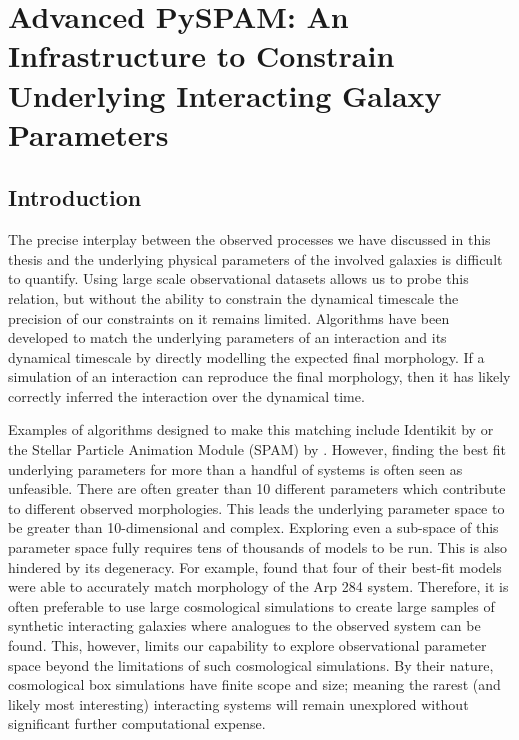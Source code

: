 \chapter{Advanced PySPAM: An Infrastructure to Constrain Underlying Interacting Galaxy Parameters}\label{chapter4}
\section{Introduction}\label{Introduction}
\noindent The precise interplay between the observed processes we have discussed in this thesis and the underlying physical parameters of the involved galaxies is difficult to quantify. Using large scale observational datasets allows us to probe this relation, but without the ability to constrain the dynamical timescale the precision of our constraints on it remains limited. Algorithms have been developed to match the underlying parameters of an interaction and its dynamical timescale by directly modelling the expected final morphology. If a simulation of an interaction can reproduce the final morphology, then it has likely correctly inferred the interaction over the dynamical time.

Examples of algorithms designed to make this matching include Identikit by \citet{2009AJ....137.3071B} or the Stellar Particle Animation Module (SPAM) by \citet{1990AJ....100.1477W}. However, finding the best fit underlying parameters for more than a handful of systems is often seen as unfeasible. There are often greater than 10 different parameters which contribute to different observed morphologies. This leads the underlying parameter space to be greater than 10-dimensional and complex. Exploring even a sub-space of this parameter space fully requires tens of thousands of models to be run. This is also hindered by its degeneracy. For example, \citet{2010ASPC..423..227S} found that four of their best-fit models were able to accurately match morphology of the Arp 284 system. Therefore, it is often preferable to use large cosmological simulations \citep[e.g.][]{2015MNRAS.446..521S, 2018MNRAS.480..800H, 2020MNRAS.493.3716H} to create large samples of synthetic interacting galaxies where analogues to the observed system can be found. This, however, limits our capability to explore observational parameter space beyond the limitations of such cosmological simulations. By their nature, cosmological box simulations have finite scope and size; meaning the rarest (and likely most interesting) interacting systems will remain unexplored without significant further computational expense.

